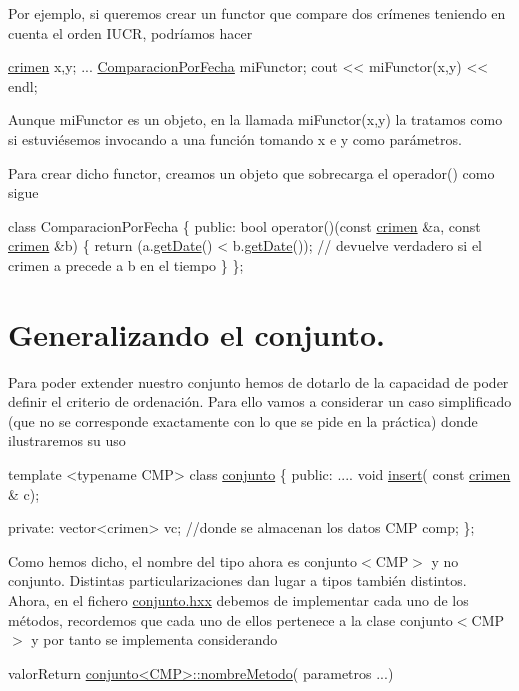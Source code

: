 Por ejemplo, si queremos crear un functor que compare dos crímenes teniendo en cuenta el orden I\+U\+C\+R, podríamos hacer


\begin{DoxyCode}
\hyperlink{classcrimen}{crimen} x,y;
...
\hyperlink{classcrimen_1_1ComparacionPorFecha}{ComparacionPorFecha} miFunctor;
cout << miFunctor(x,y) << endl;
\end{DoxyCode}
 Aunque mi\+Functor es un objeto, en la llamada mi\+Functor(x,y) la tratamos como si estuviésemos invocando a una función tomando x e y como parámetros.

Para crear dicho functor, creamos un objeto que sobrecarga el operador() como sigue


\begin{DoxyCode}
\textcolor{keyword}{class }ComparacionPorFecha \{
 \textcolor{keyword}{public}:
   \textcolor{keywordtype}{bool} operator()(\textcolor{keyword}{const} \hyperlink{classcrimen}{crimen} &a, \textcolor{keyword}{const} \hyperlink{classcrimen}{crimen} &b) \{
     \textcolor{keywordflow}{return} (a.\hyperlink{classcrimen_a8a6712e536211034819441ab87e1c215}{getDate}() < b.\hyperlink{classcrimen_a8a6712e536211034819441ab87e1c215}{getDate}()); \textcolor{comment}{// devuelve verdadero si el crimen a precede a b en
       el tiempo}
 \}
\};
\end{DoxyCode}
\hypertarget{index_generalizar}{}\section{Generalizando el conjunto.}\label{index_generalizar}
Para poder extender nuestro conjunto hemos de dotarlo de la capacidad de poder definir el criterio de ordenación. Para ello vamos a considerar un caso simplificado (que no se corresponde exactamente con lo que se pide en la práctica) donde ilustraremos su uso


\begin{DoxyCode}
\textcolor{keyword}{template} <\textcolor{keyword}{typename} CMP>
\textcolor{keyword}{class }\hyperlink{classconjunto}{conjunto} \{
  \textcolor{keyword}{public}:
    ....
    \textcolor{keywordtype}{void} \hyperlink{classconjunto_adb7f70590741e9f7db3a28de60f4452a}{insert}( \textcolor{keyword}{const} \hyperlink{classcrimen}{crimen} & c);

  \textcolor{keyword}{private}:
    vector<crimen> vc; \textcolor{comment}{//donde se almacenan los datos}
    CMP comp;
\};
\end{DoxyCode}
 Como hemos dicho, el nombre del tipo ahora es conjunto$<$\+C\+M\+P$>$ y no conjunto. Distintas particularizaciones dan lugar a tipos también distintos. Ahora, en el fichero \hyperlink{conjunto_8hxx_source}{conjunto.\+hxx} debemos de implementar cada uno de los métodos, recordemos que cada uno de ellos pertenece a la clase conjunto$<$\+C\+M\+P$>$ y por tanto se implementa considerando 
\begin{DoxyCode}
valorReturn \hyperlink{classconjunto}{conjunto<CMP>::nombreMetodo}( parametros ...)
\end{DoxyCode}


